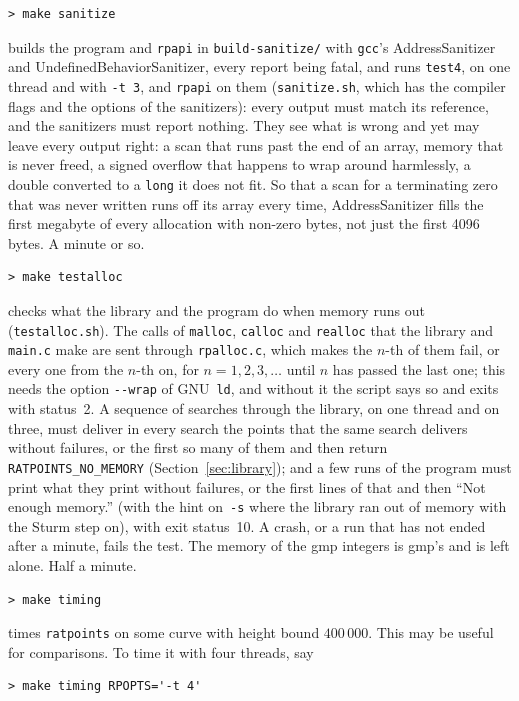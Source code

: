 \documentclass[12pt,a4paper,oneside]{amsart}
\begin{document}
\begin{verbatim}
> make sanitize
\end{verbatim}
builds the program and \texttt{rpapi} in \texttt{build-sanitize/} with
\texttt{gcc}'s AddressSanitizer and UndefinedBehaviorSanitizer, every
report being fatal, and runs \texttt{test4}, on one thread and with
\verb+-t 3+, and \texttt{rpapi} on them (\texttt{sanitize.sh}, which has
the compiler flags and the options of the sanitizers): every output must
match its reference, and the sanitizers must report nothing. They see
what is wrong and yet may leave every output right: a scan that runs past
the end of an array, memory that is never freed, a signed overflow that
happens to wrap around harmlessly, a double converted to a \texttt{long}
it does not fit. So that a scan for a terminating zero that was never
written runs off its array every time, AddressSanitizer fills the first
megabyte of every allocation with non-zero bytes, not just the first 4096
bytes. A minute or so.

\begin{verbatim}
> make testalloc
\end{verbatim}
checks what the library and the program do when memory runs out
(\texttt{testalloc.sh}). The calls of \texttt{malloc}, \texttt{calloc} and
\texttt{realloc} that the library and \texttt{main.c} make are sent through
\texttt{rpalloc.c}, which makes the $n$-th of them fail, or every one from
the $n$-th on, for $n = 1, 2, 3, \dots$ until $n$ has passed the last one;
this needs the option \texttt{-{}-wrap} of GNU~\texttt{ld}, and without it
the script says so and exits with status~2. A sequence of searches through
the library, on one thread and on three, must deliver in every search the
points that the same search delivers without failures, or the first so many
of them and then return \texttt{RATPOINTS\_NO\_MEMORY}
(Section~\ref{sec:library}); and a few runs of the program must print what
they print without failures, or the first lines of that and then ``Not
enough memory.'' (with the hint on~\verb+-s+ where the library ran out of
memory with the Sturm step on), with exit status~10. A crash, or a run that
has not ended after a minute, fails the test. The memory of the gmp
integers is gmp's and is left alone. Half a minute.

\begin{verbatim}
> make timing
\end{verbatim}
times \texttt{ratpoints} on some curve with height bound $400\,000$.
This may be useful for comparisons. To time it with four threads, say
\begin{verbatim}
> make timing RPOPTS='-t 4'
\end{verbatim}
\end{document}

